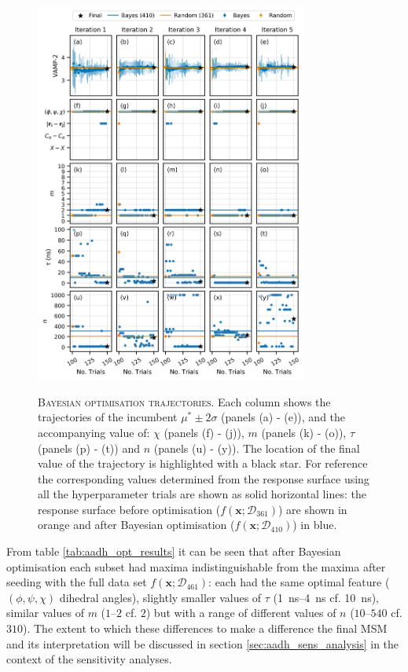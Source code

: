 \begin{figure}[p]
    \centering
    \caption[Bayesian optimisation trajectories]{\textsc{Bayesian optimisation trajectories}. Each column shows the trajectories of the incumbent $\mu^{*} \pm  2\sigma$ (panels (a) - (e)), and the accompanying value of: $\chi$ (panels (f) - (j)), $m$ (panels (k) - (o)), $\tau$ (panels (p) - (t)) and $n$ (panels (u) - (y)). The location of the final value of the trajectory is highlighted with a black star. For reference the corresponding values determined from the response surface using all the hyperparameter trials are shown as solid horizontal lines: the response surface before optimisation ($f\left(\mathbf{x}; \mathcal{D}_{361}\right)$) are shown in orange and after Bayesian optimisation ($f\left(\mathbf{x}; \mathcal{D}_{410}\right)$) in blue.}
    \includegraphics[width=0.8\textwidth]{chapters/msm_optimization/figures/aadh_opt_traj_act_s_d.png}
    \label{fig:aadh_opt_traj_d}
\end{figure}

From  table \ref{tab:aadh_opt_results} it can be seen that after Bayesian optimisation each subset had maxima indistinguishable from the maxima after seeding with the full data set $f\left(\mathbf{x};\mathcal{D}_{461}\right)$: each had the same optimal feature ($(\phi, \psi, \chi)$ dihedral angles), slightly smaller values of $\tau$ (\SIrange{1}{4}{\nano\second} cf. \SI{10}{\nano\second}), similar values of $m$ ($\numrange[range-phrase=\text{--}]{1}{2}$ cf. $2$) but with a range of different values of $n$ ($\numrange[range-phrase=\text{--}]{10}{540}$ cf. $310$). The extent to which these differences to make a difference the final MSM and its interpretation will be discussed in section \ref{sec:aadh_sens_analysis} in the context of the sensitivity analyses.

